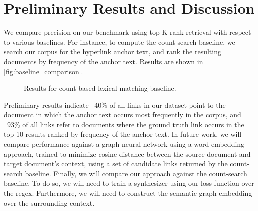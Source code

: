 \documentclass{article}
\begin{document}
\begin{figure}
\end{figure}


\section{Preliminary Results and Discussion}

We compare precision on our benchmark using top-K rank retrieval with respect to various baselines. For instance, to compute the count-search baseline, we search our corpus for the hyperlink anchor text, and rank the resulting documents by frequency of the anchor text. Results are shown in \autoref{fig:baseline_comparison}.

\begin{figure}[H]
\centering
{}
\caption{Results for count-based lexical matching baseline.}
\label{fig:baseline_comparison}
\end{figure}

Preliminary results indicate ~40\% of all links in our dataset point to the document in which the anchor text occurs most frequently in the corpus, and ~93\% of all links refer to documents where the ground truth link occurs in the top-10 results ranked by frequency of the anchor text. In future work, we will compare performance against a graph neural network using a word-embedding approach, trained to minimize cosine distance between the source document and target document's context, using a set of candidate links returned by the count-search baseline. Finally, we will compare our approach against the count-search baseline. To do so, we will need to train a synthesizer using our loss function over the regex. Furthermore, we will need to construct the semantic graph embedding over the surrounding context.

\clearpage
\newpage



\end{document}
